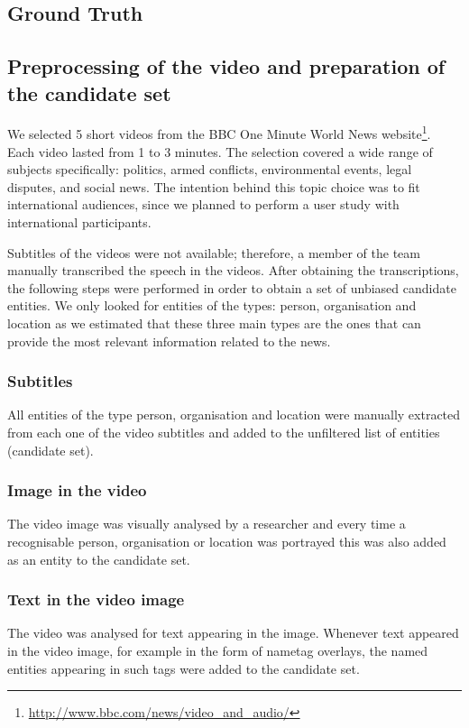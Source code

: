 \documentclass{llncs}
\begin{document}
\subsection{Ground Truth}
\label{sec:GroundTruth}
\subsection{Preprocessing of the video and preparation of the candidate set}

We selected 5 short videos from the BBC One Minute World News website\footnote{\url{http://www.bbc.com/news/video_and_audio/}}. Each video lasted from 1 to 3 minutes. The selection covered a wide range of subjects specifically: politics, armed conflicts, environmental events, legal disputes, and social news. The intention behind this topic choice was to fit international audiences, since we planned to perform a user study with international participants. 

Subtitles of the videos were not available; therefore, a member of the team manually transcribed the speech in the videos.  After obtaining the transcriptions, the following steps were performed in order to obtain a set of unbiased candidate entities. We only looked for entities of the types: person, organisation and location as we estimated that these three main types are the ones that can provide the most relevant information related to the news.  

\subsubsection{Subtitles}
All entities of the type person, organisation and location were manually extracted from each one of the video subtitles and added to the unfiltered list of entities (candidate set). 

\subsubsection{Image in the video}
The video image was visually analysed by a researcher and every time a recognisable person, organisation or location was portrayed this was also added as an entity to the candidate set. 

\subsubsection{Text in the video image}
The video was analysed for text appearing in the image. Whenever text appeared in the video image, for example in the form of nametag overlays, the named entities appearing in such tags were added to the candidate set. 
\end{document}
